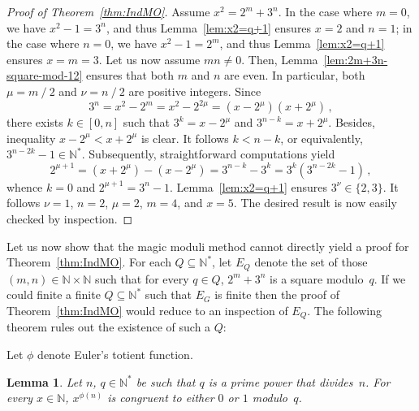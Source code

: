\documentclass[12pt]{article}
\newcommand{\bN}{\mathbb{N}} %
\newcommand{\bNast}{\bN^*}
\newcommand{\binover}{\mathbin{/}}
\newtheorem{lemma}{Lemma}
\theoremstyle{definition}
\begin{document}
   
   \begin{proof}[Proof of Theorem~\ref{thm:IndMO}]
     Assume $x^2 = 2^m + 3^n$.
     In the case where $m = 0$,
     we have $x^2 - 1 = 3^n$,
     and thus Lemma~\ref{lem:x2=q+1} ensures $x = 2$ and $n = 1$;
     in the case where $n = 0$,
     we have $x^2 - 1 = 2^m$,
     and thus Lemma~\ref{lem:x2=q+1} ensures $x = m = 3$.
     Let us now assume $mn \ne 0$.
     Then, Lemma~\ref{lem:2m+3n-square-mod-12} ensures that both $m$ and $n$ are even.
     In particular, both $\mu = m \binover 2$ and $\nu = n \binover 2$ are positive integers.
     Since 
     $$
     3^n = x^2 - 2^m = x^2 - 2^{2\mu} = (x - 2^\mu)(x + 2^\mu) \,, 
     $$
     there exists $k \in [0, n]$ such that $3^k = x - 2^\mu$ and $3^{n - k} = x + 2^\mu$.
     Besides, inequality $x - 2^\mu < x + 2^\mu$ is clear. 
     It follows $k < n - k$, or equivalently, $3^{n - 2 k} - 1 \in \bNast$.
     Subsequently, straightforward computations yield
     $$
     2^{\mu + 1} = (x + 2^\mu) - (x - 2^\mu) = 3^{n - k} - 3^k = 3^k \left( 3^{n - 2k} - 1 \right) \,,
     $$
     whence $k = 0$ and $2^{\mu + 1} = 3^n - 1$.
     Lemma~\ref{lem:x2=q+1} ensures $3^\nu \in \{ 2, 3 \}$.
     It follows $\nu = 1$, $n = 2$, $\mu = 2$, $m = 4$, and $x = 5$.
     The desired result is now easily checked by inspection. 
  \end{proof}

  Let us now show that 
  the magic moduli method cannot directly yield a proof for Theorem~\ref{thm:IndMO}.
  For each $Q \subseteq \bNast$,
  let $E_Q$ denote the set of those $(m, n) \in \bN \times \bN$ such that for every $q \in Q$,
  $2^m + 3^n$ is a square modulo~$q$.
  If we could finite a finite $Q \subseteq \bNast$ such that $E_G$ is finite
  then the proof of Theorem~\ref{thm:IndMO} would reduce to an inspection of $E_Q$.
  The following theorem rules out the existence of such a $Q$:

  Let $\phi$ denote Euler's totient function.

  \begin{lemma}
    Let $n$, $q \in \bNast$ be such that $q$ is a prime power that divides~$n$.
   For every $x \in \bN$, $x^{\phi(n)}$ is congruent to either $0$ or $1$ modulo~$q$.
  \end{lemma}
\end{document}

